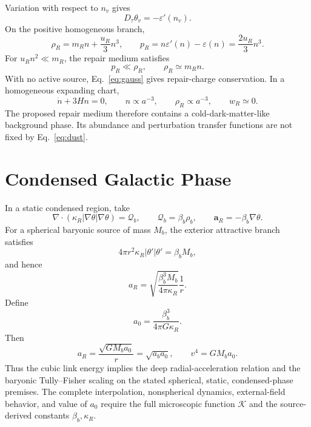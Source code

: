 \documentclass[11pt]{article}
\begin{document}
Variation with respect to \(n_v\) gives
\begin{equation}
D_\tau\theta_v=-\varepsilon'(n_v).
\end{equation}
On the positive homogeneous branch,
\begin{equation}
\rho_R=m_Rn+\frac{u_R}{3}n^3,
\qquad
p_R=n\varepsilon'(n)-\varepsilon(n)=\frac{2u_R}{3}n^3.
\label{eq:eos}
\end{equation}
For \(u_Rn^2\ll m_R\), the repair medium satisfies
\begin{equation}
p_R\ll\rho_R,
\qquad
\rho_R\simeq m_Rn.
\end{equation}
With no active source, Eq.~\eqref{eq:gauss} gives repair-charge conservation.
In a homogeneous expanding chart,
\begin{equation}
\dot n+3Hn=0,
\qquad
n\propto a^{-3},
\qquad
\rho_R\propto a^{-3},
\qquad
w_R\simeq0.
\label{eq:dust}
\end{equation}
The proposed repair medium therefore contains a cold-dark-matter-like
background phase. Its abundance and perturbation transfer functions are not
fixed by Eq.~\eqref{eq:dust}.

\section{Condensed Galactic Phase}

In a static condensed region, take
\begin{equation}
\nabla\!\cdot\!\left(\kappa_R|\nabla\theta|\nabla\theta\right)
=\mathcal Q_b,
\qquad
\mathcal Q_b=\beta_b\rho_b,
\qquad
\mathbf a_R=-\beta_b\nabla\theta.
\label{eq:galaxy-system}
\end{equation}
For a spherical baryonic source of mass \(M_b\), the exterior attractive
branch satisfies
\begin{equation}
4\pi r^2\kappa_R|\theta'|\theta'=\beta_bM_b,
\end{equation}
and hence
\begin{equation}
a_R=\sqrt{\frac{\beta_b^3M_b}{4\pi\kappa_R}}\frac1r.
\end{equation}
Define
\begin{equation}
a_0=\frac{\beta_b^3}{4\pi G\kappa_R}.
\label{eq:a0}
\end{equation}
Then
\begin{equation}
\boxed{a_R=\frac{\sqrt{GM_ba_0}}{r}=\sqrt{a_ba_0}},
\qquad
\boxed{v^4=GM_ba_0}.
\label{eq:deep-law}
\end{equation}
Thus the cubic link energy implies the deep radial-acceleration relation and
the baryonic Tully--Fisher scaling on the stated spherical, static,
condensed-phase premises. The complete interpolation, nonspherical dynamics,
external-field behavior, and value of \(a_0\) require the full microscopic
function \(\mathcal K\) and the source-derived constants \(\beta_b,\kappa_R\).
\end{document}
